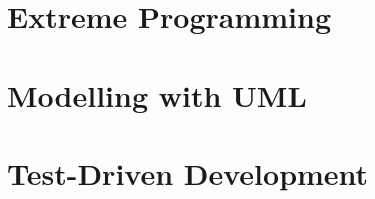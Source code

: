 \documentclass[]{UCD_CS_FYP_Report}
\begin{document}
\maketitle

\tableofcontents{}\newpage
\newpage

\chapter{Extreme Programming}


\chapter{Modelling with UML}


\chapter{Test-Driven Development}


% 

% 

% 

% 

\newpage


\label{endpage}
\end{document}
